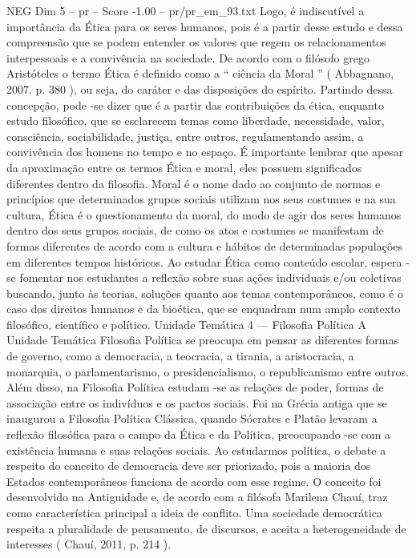 \begin{textsample}{NEG Dim 5 – pr – Score -1.00 – pr/pr\_em\_93.txt}
Logo, é indiscutível a importância da Ética para os seres humanos, pois é a partir desse estudo e dessa compreensão que se podem entender os valores que regem os relacionamentos interpessoais e a convivência na sociedade.
De acordo com o filósofo grego Aristóteles o termo Ética é definido como a “ ciência da Moral ” ( Abbagnano, 2007. p. 380 ), ou seja, do caráter e das disposições do espírito.
Partindo dessa concepção, pode -se dizer que é a partir das contribuições da ética, enquanto estudo filosófico, que se esclarecem temas como liberdade, necessidade, valor, consciência, sociabilidade, justiça, entre outros, regulamentando assim, a convivência dos homens no tempo e no espaço.
É importante lembrar que apesar da aproximação entre os termos Ética e moral, eles possuem significados diferentes dentro da filosofia.
Moral é o nome dado ao conjunto de normas e princípios que determinados grupos sociais utilizam nos seus costumes e na sua cultura, Ética é o questionamento da moral, do modo de agir dos seres humanos dentro dos seus grupos sociais, de como os atos e costumes se manifestam de formas diferentes de acordo com a cultura e hábitos de determinadas populações em diferentes tempos históricos.
Ao estudar Ética como conteúdo escolar, espera -se fomentar nos estudantes a reflexão sobre suas ações individuais e/ou coletivas buscando, junto às teorias, soluções quanto aos temas contemporâneos, como é o caso dos direitos humanos e da bioética, que se enquadram num amplo contexto filosófico, científico e político.
Unidade Temática 4 — Filosofia Política A Unidade Temática Filosofia Política se preocupa em pensar as diferentes formas de governo, como a democracia, a teocracia, a tirania, a aristocracia, a monarquia, o parlamentarismo, o presidencialismo, o republicanismo entre outros.
Além disso, na Filosofia Política estudam -se as relações de poder, formas de associação entre os indivíduos e os pactos sociais.
Foi na Grécia antiga que se inaugurou a Filosofia Política Clássica, quando Sócrates e Platão levaram a reflexão filosófica para o campo da Ética e da Política, preocupando -se com a existência humana e suas relações sociais.
Ao estudarmos política, o debate a respeito do conceito de democracia deve ser priorizado, pois a maioria dos Estados contemporâneos funciona de acordo com esse regime.
O conceito foi desenvolvido na Antiguidade e, de acordo com a filósofa Marilena Chauí, traz como característica principal a ideia de conflito.
Uma sociedade democrática respeita a pluralidade de pensamento, de discursos, e aceita a heterogeneidade de interesses ( Chauí, 2011, p. 214 ).

\end{textsample}
